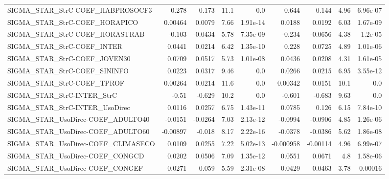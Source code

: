 \begin{tabular}{lrrrrrrrr}
SIGMA\_STAR\_StrC-COEF\_HABPROSOCF3     &      -0.278 &       -0.173 &    11.1 &      0.0 &     -0.644 &      -0.144 &         4.96 &      6.96e-07 \\
SIGMA\_STAR\_StrC-COEF\_HORAPICO        &     0.00464 &       0.0079 &    7.66 & 1.91e-14 &     0.0188 &      0.0192 &         6.03 &      1.67e-09 \\
SIGMA\_STAR\_StrC-COEF\_HORASTRAB       &      -0.103 &      -0.0434 &    5.78 & 7.35e-09 &     -0.234 &     -0.0656 &         4.38 &       1.2e-05 \\
SIGMA\_STAR\_StrC-COEF\_INTER           &      0.0441 &       0.0214 &    6.42 & 1.35e-10 &      0.228 &      0.0725 &         4.89 &      1.01e-06 \\
SIGMA\_STAR\_StrC-COEF\_JOVEN30         &      0.0709 &       0.0517 &    5.73 & 1.01e-08 &     0.0436 &      0.0208 &         4.31 &      1.61e-05 \\
SIGMA\_STAR\_StrC-COEF\_SININFO         &      0.0223 &       0.0317 &    9.46 &      0.0 &     0.0266 &      0.0215 &         6.95 &      3.55e-12 \\
SIGMA\_STAR\_StrC-COEF\_TPROF           &     0.00264 &       0.0214 &    11.6 &      0.0 &    0.00342 &      0.0151 &         10.1 &           0.0 \\
SIGMA\_STAR\_StrC-INTER\_StrC           &       -0.51 &       -0.629 &    10.2 &      0.0 &     -0.601 &      -0.683 &         9.63 &           0.0 \\
SIGMA\_STAR\_StrC-INTER\_UsoDirec       &      0.0116 &       0.0257 &    6.75 & 1.43e-11 &     0.0785 &       0.126 &         6.15 &      7.84e-10 \\
SIGMA\_STAR\_UsoDirec-COEF\_ADULTO40    &     -0.0151 &      -0.0264 &    7.03 & 2.13e-12 &    -0.0994 &     -0.0906 &         4.85 &      1.26e-06 \\
SIGMA\_STAR\_UsoDirec-COEF\_ADULTO60    &    -0.00897 &       -0.018 &    8.17 & 2.22e-16 &    -0.0378 &     -0.0386 &         5.62 &      1.86e-08 \\
SIGMA\_STAR\_UsoDirec-COEF\_CLIMASECO   &      0.0109 &       0.0255 &    7.22 & 5.02e-13 &  -0.000958 &    -0.00114 &         4.96 &      6.99e-07 \\
SIGMA\_STAR\_UsoDirec-COEF\_CONGCD      &      0.0202 &       0.0506 &    7.09 & 1.35e-12 &     0.0551 &      0.0671 &          4.8 &      1.58e-06 \\
SIGMA\_STAR\_UsoDirec-COEF\_CONGEF      &      0.0271 &        0.059 &    5.59 & 2.31e-08 &     0.0429 &      0.0463 &         3.78 &       0.00016 \\

\end{tabular}
